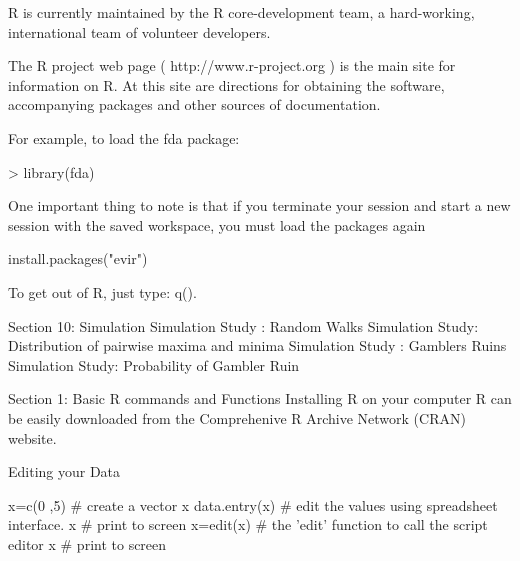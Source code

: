 \begin{frame}
R is currently maintained by the R core-development team, a hard-working, international team of volunteer developers. 

The R project web page ( http://www.r-project.org ) is the main site for information on R. At this site are directions for obtaining the software, accompanying packages and other sources of documentation.

\end{frame}

\begin{frame}

For example, to load the fda package:

> library(fda)

One important thing to note is that if you terminate your session and start a new session with the saved workspace, you must load  the packages again



install.packages("evir")
 
To get out of R, just type: q(). 

\end{frame}

\begin{frame}

Section 10: Simulation
Simulation Study : Random Walks
Simulation Study: Distribution of pairwise maxima and minima
Simulation Study : Gamblers Ruins
Simulation Study: Probability of Gambler Ruin

\end{frame}
\begin{frame}

Section 1: Basic R commands and Functions
Installing R on your computer
R can be easily downloaded from the Comprehenive R Archive Network (CRAN) website.
\end{frame}
\begin{frame}

Editing your Data

x=c(0 ,5)     	      # create a vector x
data.entry(x)  	   # edit the values using spreadsheet interface.
x  	                     # print to screen
x=edit(x)	          # the 'edit' function to call the script editor
x  	                     # print to screen

\end{frame}


